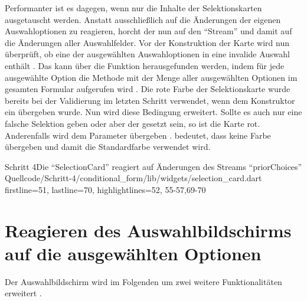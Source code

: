 Performanter ist es dagegen,
wenn nur die Inhalte der Selektionskarten ausgetauscht werden.
Anstatt ausschließlich auf die Änderungen der eigenen Auswahloptionen zu reagieren,
horcht der  nun auf den \enquote{Stream}  
und damit auf die Änderungen aller Auswahlfelder.
Vor der Konstruktion der Karte wird nun überprüft,
ob eine der ausgewählten Auswahloptionen in  eine invalide Auswahl enthält .
Das kann über die Funktion  herausgefunden werden,
indem  für jede ausgewählte Option die Methode  mit der Menge aller ausgewählten Optionen im gesamten Formular aufgerufen wird . 
Die rote Farbe der Selektionskarte wurde bereits bei der Validierung im letzten Schritt verwendet,
wenn dem Konstruktor ein  übergeben wurde.
Nun wird diese Bedingung erweitert.
Sollte es auch nur eine falsche Selektion geben
oder aber der  gesetzt sein,
so ist die Karte rot.
Anderenfalls wird dem Parameter   übergeben .
 bedeutet, dass keine Farbe übergeben und damit die Standardfarbe verwendet wird.

\begin{alexlisting}{Schritt 4}{Die \enquote{SelectionCard} reagiert auf Änderungen des Streams \enquote{priorChoices}}
  {Quellcode/Schritt-4/conditional_form/lib/widgets/selection_card.dart}
  {firstline=51, lastline=70, highlightlines={52, 55-57,69-70}}
  \label{lst:Schritt4StreamBuilderpriorChoices}
\end{alexlisting} 


\section{Reagieren des Auswahlbildschirms auf die ausgewählten Optionen}



Der Auswahlbildschirm wird im Folgenden um zwei weitere Funktionalitäten erweitert \Lst{\ref{lst:Schritt4selectedAndSelectableChoices}}.


